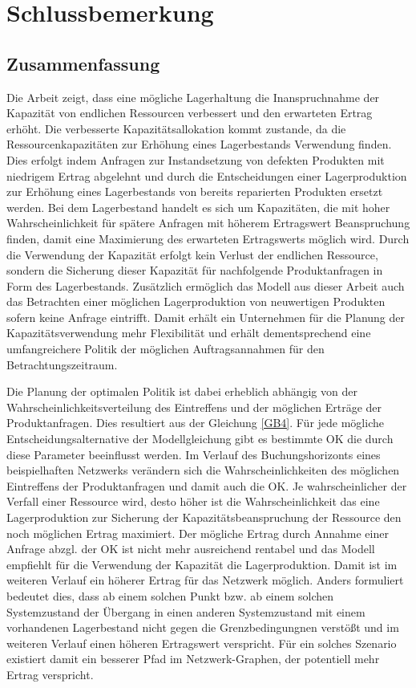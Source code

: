 \chapter{Schlussbemerkung}
\setcounter{footnote}{9}

\section*{Zusammenfassung}

Die Arbeit zeigt, dass eine mögliche Lagerhaltung die Inanspruchnahme der Kapazität von endlichen Ressourcen verbessert und den erwarteten Ertrag erhöht. Die verbesserte Kapazitätsallokation kommt zustande, da die Ressourcenkapazitäten zur Erhöhung eines Lagerbestands Verwendung finden. Dies erfolgt indem Anfragen zur Instandsetzung von defekten Produkten mit niedrigem Ertrag abgelehnt und durch die Entscheidungen einer Lagerproduktion zur Erhöhung eines Lagerbestands von bereits reparierten Produkten ersetzt werden. Bei dem Lagerbestand handelt es sich um Kapazitäten, die mit hoher Wahrscheinlichkeit für spätere Anfragen mit höherem Ertragswert Beanspruchung finden, damit eine Maximierung des erwarteten Ertragswerts möglich wird. Durch die Verwendung der Kapazität erfolgt kein Verlust der endlichen Ressource, sondern die Sicherung dieser Kapazität für nachfolgende Produktanfragen in Form des Lagerbestands. Zusätzlich ermöglich das Modell aus dieser Arbeit auch das Betrachten einer möglichen Lagerproduktion von neuwertigen Produkten sofern keine Anfrage eintrifft. Damit erhält ein Unternehmen für die Planung der Kapazitätsverwendung mehr Flexibilität und erhält dementsprechend eine umfangreichere Politik der möglichen Auftragsannahmen für den Betrachtungszeitraum.

Die Planung der optimalen Politik ist dabei erheblich abhängig von der Wahrscheinlichkeitsverteilung des Eintreffens und der möglichen Erträge der Produktanfragen. Dies resultiert aus der Gleichung \eqref{GB4}. Für jede mögliche Entscheidungsalternative der Modellgleichung gibt es bestimmte OK die durch diese Parameter beeinflusst werden. Im Verlauf des Buchungshorizonts eines beispielhaften Netzwerks verändern sich die Wahrscheinlichkeiten des möglichen Eintreffens der Produktanfragen und damit auch die OK. Je wahrscheinlicher der Verfall einer Ressource wird, desto höher ist die Wahrscheinlichkeit das eine Lagerproduktion zur Sicherung der Kapazitätsbeanspruchung der Ressource den noch möglichen Ertrag maximiert. Der mögliche Ertrag durch Annahme einer Anfrage abzgl. der OK ist nicht mehr ausreichend rentabel und das Modell empfiehlt für die Verwendung der Kapazität die Lagerproduktion. Damit ist im weiteren Verlauf ein höherer Ertrag für das Netzwerk möglich. Anders formuliert bedeutet dies, dass ab einem solchen Punkt bzw. ab einem solchen Systemzustand der Übergang in einen anderen Systemzustand mit einem vorhandenen Lagerbestand nicht gegen die Grenzbedingungnen verstößt und im weiteren Verlauf einen höheren Ertragswert verspricht. Für ein solches Szenario existiert damit ein besserer Pfad im Netzwerk-Graphen, der potentiell mehr Ertrag verspricht.

